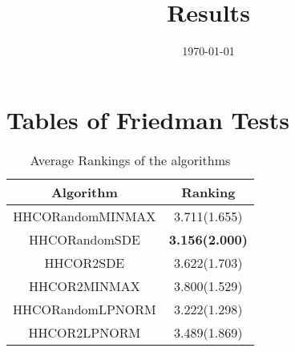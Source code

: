 \documentclass{article}
\title{Results}
\author{}
\date{\today}
\begin{document}
\oddsidemargin 0in \topmargin 0in\maketitle
\section{Tables of Friedman Tests}
\begin{table}[!htp]
\centering
\caption{Average Rankings of the algorithms
}\begin{tabular}{|c|c|}
\hline
Algorithm&Ranking\\
\hline
HHCORandomMINMAX&3.711(1.655)\\\hline
HHCORandomSDE& {\bf 3.156(2.000)}\\\hline
HHCOR2SDE&3.622(1.703)\\\hline
HHCOR2MINMAX&3.800(1.529)\\\hline
HHCORandomLPNORM&3.222(1.298)\\\hline
HHCOR2LPNORM&3.489(1.869)\\\hline
\end{tabular}
\end{table}
\end{document}
